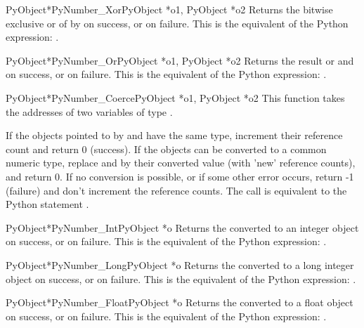      \begin{cfuncdesc}{PyObject*}{PyNumber_Xor}{PyObject *o1, PyObject *o2}
	 Returns the bitwise exclusive or of  by  on success, or
	 {\NULL} on failure.  This is the equivalent of the Python
	 expression: .
     \end{cfuncdesc}

     \begin{cfuncdesc}{PyObject*}{PyNumber_Or}{PyObject *o1, PyObject *o2}
	 Returns the result or  and  on success, or {\NULL} on
	 failure.  This is the equivalent of the Python expression: 
	 .
     \end{cfuncdesc}


     \begin{cfuncdesc}{PyObject*}{PyNumber_Coerce}{PyObject *o1, PyObject *o2}
	 This function takes the addresses of two variables of type
         .

         If the objects pointed to by  and  have the same type,
         increment their reference count and return 0 (success).
         If the objects can be converted to a common numeric type,
         replace  and  by their converted value (with 'new'
         reference counts), and return 0.
         If no conversion is possible, or if some other error occurs,
         return -1 (failure) and don't increment the reference counts.
         The call  is equivalent to the Python
         statement .
     \end{cfuncdesc}


     \begin{cfuncdesc}{PyObject*}{PyNumber_Int}{PyObject *o}
	 Returns the  converted to an integer object on success, or
	 {\NULL} on failure.  This is the equivalent of the Python
	 expression: .
     \end{cfuncdesc}


     \begin{cfuncdesc}{PyObject*}{PyNumber_Long}{PyObject *o}
	 Returns the  converted to a long integer object on success,
	 or {\NULL} on failure.  This is the equivalent of the Python
	 expression: .
     \end{cfuncdesc}


     \begin{cfuncdesc}{PyObject*}{PyNumber_Float}{PyObject *o}
	 Returns the  converted to a float object on success, or {\NULL}
	 on failure.  This is the equivalent of the Python expression:
	 .
     \end{cfuncdesc}


